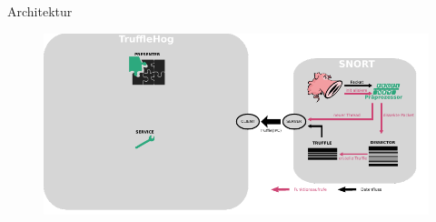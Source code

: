 \begin{frame}{Architektur}
    \begin{figure}
    	\centering
    	\includegraphics[width=\textwidth]{./images/arch/9.pdf}
    \end{figure}
\end{frame}
